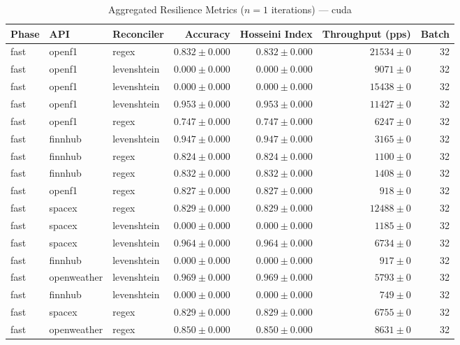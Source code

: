 
\begin{table}[htbp]
\caption{Aggregated Resilience Metrics ($n=1$ iterations) --- cuda}
\begin{tabular}{l l l r r r r}
\hline
Phase & API & Reconciler & Accuracy & Hosseini Index & Throughput (pps) & Batch \\
\hline
fast & openf1 & regex & $0.832\pm0.000$ & $0.832\pm0.000$ & $21534\pm0$ & 32 \\
fast & openf1 & levenshtein & $0.000\pm0.000$ & $0.000\pm0.000$ & $9071\pm0$ & 32 \\
fast & openf1 & levenshtein & $0.000\pm0.000$ & $0.000\pm0.000$ & $15438\pm0$ & 32 \\
fast & openf1 & levenshtein & $0.953\pm0.000$ & $0.953\pm0.000$ & $11427\pm0$ & 32 \\
fast & openf1 & regex & $0.747\pm0.000$ & $0.747\pm0.000$ & $6247\pm0$ & 32 \\
fast & finnhub & levenshtein & $0.947\pm0.000$ & $0.947\pm0.000$ & $3165\pm0$ & 32 \\
fast & finnhub & regex & $0.824\pm0.000$ & $0.824\pm0.000$ & $1100\pm0$ & 32 \\
fast & finnhub & regex & $0.832\pm0.000$ & $0.832\pm0.000$ & $1408\pm0$ & 32 \\
fast & openf1 & regex & $0.827\pm0.000$ & $0.827\pm0.000$ & $918\pm0$ & 32 \\
fast & spacex & regex & $0.829\pm0.000$ & $0.829\pm0.000$ & $12488\pm0$ & 32 \\
fast & spacex & levenshtein & $0.000\pm0.000$ & $0.000\pm0.000$ & $1185\pm0$ & 32 \\
fast & spacex & levenshtein & $0.964\pm0.000$ & $0.964\pm0.000$ & $6734\pm0$ & 32 \\
fast & finnhub & levenshtein & $0.000\pm0.000$ & $0.000\pm0.000$ & $917\pm0$ & 32 \\
fast & openweather & levenshtein & $0.969\pm0.000$ & $0.969\pm0.000$ & $5793\pm0$ & 32 \\
fast & finnhub & levenshtein & $0.000\pm0.000$ & $0.000\pm0.000$ & $749\pm0$ & 32 \\
fast & spacex & regex & $0.829\pm0.000$ & $0.829\pm0.000$ & $6755\pm0$ & 32 \\
fast & openweather & regex & $0.850\pm0.000$ & $0.850\pm0.000$ & $8631\pm0$ & 32 \\

\end{tabular}
\end{table}
